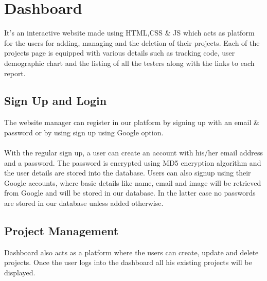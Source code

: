 \documentclass[hidelinks,12pt,a4paper,final]{extreport}
\begin{document}
\section{Dashboard}
It's an interactive website made using HTML,CSS \& JS which acts as platform for the users for adding, managing and the deletion of their projects.
Each of the projects page is equipped with various details such as tracking code, user demographic chart and the listing of all the testers along with the links to each report.

\subsection{Sign Up and Login}
The website manager can register in our platform by signing up with an email \& password or by using sign up using Google option.
\paragraph{}
With the regular sign up, a user can create an account with his/her email address and a password. The password is encrypted using MD5 encryption algorithm and the user details are stored into the database.
Users can also signup using their Google accounts, where basic details like name, email and image will be retrieved from Google and will be stored in our database. In the latter case no passwords are stored in our database unless added otherwise.

\subsection{Project Management}
Dashboard also acts as a platform where the users can create, update and delete projects. Once the user logs into the dashboard all his existing projects will be displayed. 
\end{document}
